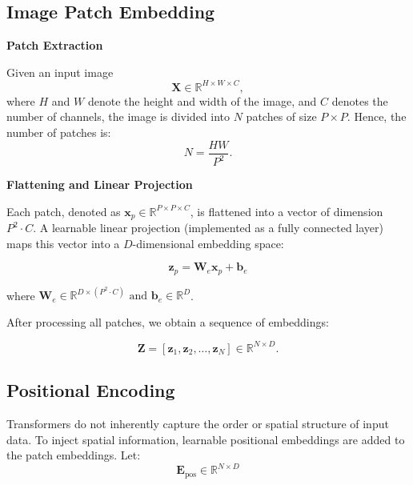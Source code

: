 \subsection{Image Patch Embedding}

\textbf{Patch Extraction}

Given an input image 
\begin{equation}
    \mathbf{X} \in \mathbb{R}^{H \times W \times C},
\end{equation}
where \(H\) and \(W\) denote the height and width of the image, and \(C\) denotes the number of channels, the image is divided into \(N\) patches of size \(P \times P\). Hence, the number of patches is:
\begin{equation}
N = \frac{HW}{P^2}.
\end{equation}

\textbf{Flattening and Linear Projection}

Each patch, denoted as \(\mathbf{x}_p \in \mathbb{R}^{P \times P \times C}\), is flattened into a vector of dimension \(P^2 \cdot C\). A learnable linear projection (implemented as a fully connected layer) maps this vector into a \(D\)-dimensional embedding space:

\begin{equation}
    \mathbf{z}_p = \mathbf{W}_e \mathbf{x}_p + \mathbf{b}_e
\end{equation}

where $\mathbf{W}_e \in \mathbb{R}^{D \times (P^2 \cdot C)} \text{ and } \mathbf{b}_e \in \mathbb{R}^{D}$.

After processing all patches, we obtain a sequence of embeddings:

\begin{equation}
\mathbf{Z} = \left[\mathbf{z}_1, \mathbf{z}_2, \dots, \mathbf{z}_N\right] \in \mathbb{R}^{N \times D}.
\end{equation}

\subsection{Positional Encoding}

Transformers do not inherently capture the order or spatial structure of input data. To inject spatial information, learnable positional embeddings are added to the patch embeddings. Let:
\begin{equation}
\mathbf{E}_{\text{pos}} \in \mathbb{R}^{N \times D}
\end{equation}

